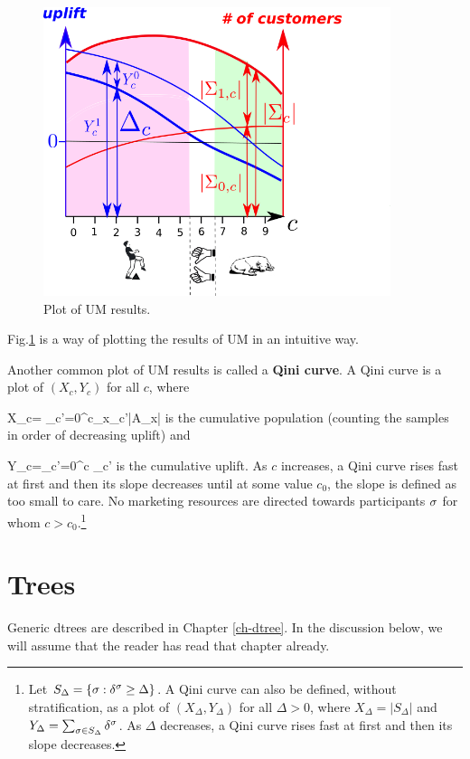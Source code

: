 \documentclass[12pt]{report}
\begin{document}
\begin{figure}[h!]
\centering
\includegraphics[width=4in]
{../uplift/qini-fake.png}

\caption{
Plot
of UM results.
}
\label{fig-qini-fake}
\end{figure}
Fig.\ref{fig-qini-fake}
is a  way of
plotting
the results
of UM in an
intuitive
way.


Another common plot of UM results is
called a {\bf Qini
curve}.
A Qini curve is a plot
of $(X_c,Y_c)$
for all $c$, where

\beq
X_c= \sum_{c'=0}^{c}\sum_{x\in \calx_{c'}}|A_x|
\eeq
is the cumulative population (counting the
samples in
order of decreasing uplift) and

\beq
Y_c=\sum_{c'=0}^c \Delta_{c'}
\eeq
is the cumulative uplift.
As $c$ increases, a Qini curve rises fast at first and then its slope decreases until
at some value $c_0$, the slope is defined as too small to care. No marketing resources are
directed towards
participants $\sigma$ for whom  $c>c_0$.\footnote{
Let
$S_{\Delta} = \{\sigma:\delta^\sigma \geq \Delta\}$.
A Qini curve can also be defined, without stratification,
as a
 plot of $(X_\Delta, Y_\Delta)$ for all $\Delta>0$,
where $
X_\Delta = |S_{\Delta}|$
and
$
Y_\Delta= \sum_{\sigma\in S_{\Delta}}\delta^\sigma
$. As $\Delta$ decreases, a Qini curve rises fast at first and then its slope decreases.
}

\section{Trees}

Generic dtrees are
described in Chapter \ref{ch-dtree}.
In the discussion below, we will assume that the reader has read
that chapter already.
\end{document}
